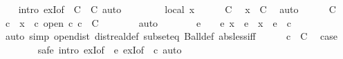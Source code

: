 \begin{isabellebody}
\ {\isacharasterisk}{\kern0pt}\ \isamarkupfalse%
\ {\isacharparenleft}{\kern0pt}intro\ exI{\isacharbrackleft}{\kern0pt}of\ {\isacharunderscore}{\kern0pt}\ {\isachardoublequoteopen}C{}\ {\isasymunion}\ C{}{\isachardoublequoteclose}{\isacharbrackright}{\kern0pt}{\isacharparenright}{\kern0pt}\ auto\isanewline
\ \ \isamarkupfalse%
\isanewline
\ \ \ \ \isamarkupfalse%
\ {\isacharparenleft}{\kern0pt}local\ x{\isacharparenright}{\kern0pt}\isanewline
\ \ \ \ \isamarkupfalse%
\ C\ \isamarkupfalse%
\ {\isachardoublequoteopen}x\ {\isasymin}\ {\isasymUnion}C{\isachardoublequoteclose}\ \isamarkupfalse%
\ auto\isanewline
\ \ \ \ \isamarkupfalse%
\ C{\isacharparenleft}{\kern0pt}{}{\isacharparenright}{\kern0pt}\ \isamarkupfalse%
\ c\ \ {\isachardoublequoteopen}x\ {\isasymin}\ c{\isachardoublequoteclose}\ {\isachardoublequoteopen}open\ c{\isachardoublequoteclose}\ {\isachardoublequoteopen}c\ {\isasymin}\ C{\isachardoublequoteclose}\isanewline
\ \ \ \ \ \ \isamarkupfalse%
\ auto\isanewline
\ \ \ \ \isamarkupfalse%
\ \isamarkupfalse%
\ e\ \ {\isachardoublequoteopen}{}\ {\isacharless}{\kern0pt}\ e{\isachardoublequoteclose}\ {\isachardoublequoteopen}{\isacharbraceleft}{\kern0pt}x\ {\isacharminus}{\kern0pt}\ e\ {\isacharless}{\kern0pt}{\isachardot}{\kern0pt}{\isachardot}{\kern0pt}{\isacharless}{\kern0pt}\ x\ {\isacharplus}{\kern0pt}\ e{\isacharbraceright}{\kern0pt}\ {\isasymsubseteq}\ c{\isachardoublequoteclose}\isanewline
\ \ \ \ \ \ \isamarkupfalse%
\ {\isacharparenleft}{\kern0pt}auto\ simp{\isacharcolon}{\kern0pt}\ open{\isacharunderscore}{\kern0pt}dist\ dist{\isacharunderscore}{\kern0pt}real{\isacharunderscore}{\kern0pt}def\ subset{\isacharunderscore}{\kern0pt}eq\ Ball{\isacharunderscore}{\kern0pt}def\ abs{\isacharunderscore}{\kern0pt}less{\isacharunderscore}{\kern0pt}iff{\isacharparenright}{\kern0pt}\isanewline
\ \ \ \ \isamarkupfalse%
\ {\isacartoucheopen}c\ {\isasymin}\ C{\isacartoucheclose}\ \isamarkupfalse%
\ {\isacharquery}{\kern0pt}case\isanewline
\ \ \ \ \ \ \isamarkupfalse%
\ {\isacharparenleft}{\kern0pt}safe\ intro{\isacharbang}{\kern0pt}{\isacharcolon}{\kern0pt}\ exI{\isacharbrackleft}{\kern0pt}of\ {\isacharunderscore}{\kern0pt}\ {\isachardoublequoteopen}e{\isacharslash}{\kern0pt}{}{\isachardoublequoteclose}{\isacharbrackright}{\kern0pt}\ exI{\isacharbrackleft}{\kern0pt}of\ {\isacharunderscore}{\kern0pt}\ {\isachardoublequoteopen}{\isacharbraceleft}{\kern0pt}c{\isacharbraceright}{\kern0pt}{\isachardoublequoteclose}{\isacharbrackright}{\kern0pt}{\isacharparenright}{\kern0pt}\ auto\isanewline

\end{isabellebody}
